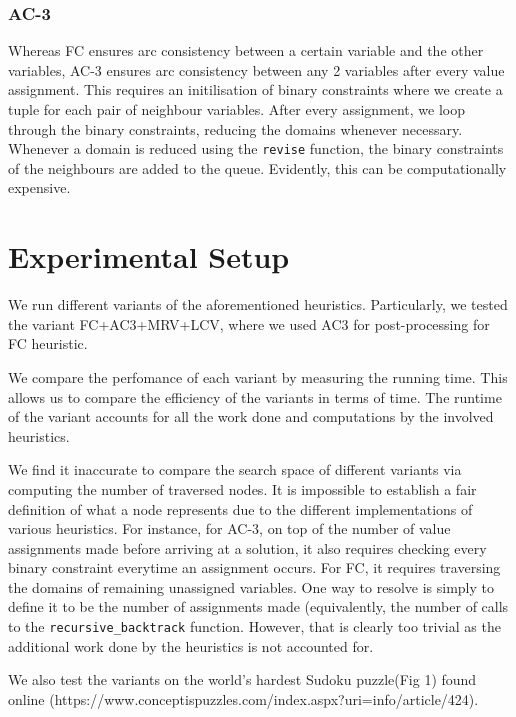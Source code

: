 \documentclass[runningheads]{llncs}
\begin{document}
\subsubsection{AC-3}

Whereas FC ensures arc consistency between a certain variable and the other variables, AC-3 ensures arc consistency between any 2 variables after every value assignment. This requires an initilisation of binary constraints where we create a tuple for each pair of neighbour variables. After every assignment, we loop through the binary constraints, reducing the domains whenever necessary. Whenever a domain is reduced using the \verb`revise` function, the binary constraints of the neighbours are added to the queue. Evidently, this can be computationally expensive. 

\section{Experimental Setup}

We run different variants of the aforementioned heuristics. Particularly, we tested the variant FC+AC3+MRV+LCV, where we used AC3 for post-processing for FC heuristic. 

We compare the perfomance of each variant by measuring the running time. This allows us to compare the efficiency of the variants in terms of time. The runtime of the variant accounts for all the work done and computations by the involved heuristics.

We find it inaccurate to compare the search space of different variants via computing the number of traversed nodes. It is impossible to establish a fair definition of what a node represents due to the different implementations of various heuristics. For instance, for AC-3, on top of the number of value assignments made before arriving at a solution, it also requires checking every binary constraint everytime an assignment occurs. For FC, it requires traversing the domains of remaining unassigned variables. One way to resolve is simply to define it to be the number of assignments made (equivalently, the number of calls to the \verb`recursive_backtrack` function. However, that is clearly too trivial as the additional work done by the heuristics is not accounted for. 

We also test the variants on the world's hardest Sudoku puzzle(Fig 1) found online (https://www.conceptispuzzles.com/index.aspx?uri=info/article/424).
\end{document}
